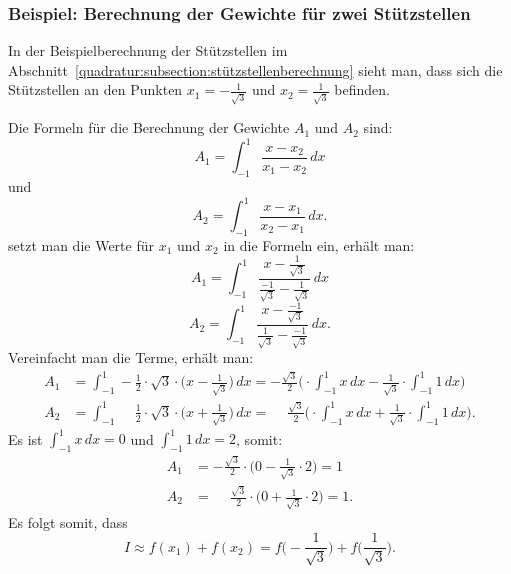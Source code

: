 \subsubsection{Beispiel: Berechnung der Gewichte für zwei Stützstellen}
In der Beispielberechnung der Stützstellen im
Abschnitt~\ref{quadratur:subsection:stützstellenberechnung} sieht man, dass sich die 
Stützstellen an den Punkten $x_{1} = -\frac{1}{\sqrt{3}} $ und $x_{2} = \frac{1}{\sqrt{3}} $ befinden.

Die Formeln für die Berechnung der Gewichte $A_{1}$ und $A_{2}$ sind:
\begin{equation*}
    A_{1} = \int_{-1}^{1} \frac{x - x_{2}}{x_{1} - x_{2}} \, dx
\end{equation*}
und
\begin{equation}
    A_{2} = \int_{-1}^{1} \frac{x - x_{1}}{x_{2} - x_{1}} \, dx.
\end{equation}
setzt man die Werte für $x_{1}$ und $x_{2}$ in die Formeln ein, erhält man:
\begin{equation*}
    A_{1} = \int_{-1}^{1} \frac{x - \frac{1}{\sqrt{3}}}{\frac{-1}{\sqrt{3}} - \frac{1}{\sqrt{3}}} \, dx
\end{equation*}
\begin{equation}
    A_{2} = \int_{-1}^{1} \frac{x - \frac{-1}{\sqrt{3}}}{\frac{1}{\sqrt{3}} - \frac{-1}{\sqrt{3}}} \, dx.
\end{equation}
Vereinfacht man die Terme, erhält man:
\begin{align}
    A_{1} 
    &=
    \int_{-1}^{1} -\frac{1}{2} 
    \cdot \sqrt{3} 
    \cdot \bigg(x - \frac{1}{\sqrt{3}}\bigg)
    \, dx
    =
    -\frac{\sqrt{3}}{2} 
    \bigg(
    \cdot \int_{-1}^{1}x\,dx
    -
    \frac{1}{\sqrt{3}} 
    \cdot \int_{-1}^{1}1\,dx
    \bigg)
    \\
    A_{2} 
    &=
    \int_{-1}^{1} \phantom{-}\frac{1}{2} 
    \cdot \sqrt{3}  
    \cdot \bigg(x + \frac{1}{\sqrt{3}}\bigg)
    \, dx
    =
    \phantom{-}
    \frac{\sqrt{3}}{2} 
    \bigg(
    \cdot \int_{-1}^{1}x\,dx
    +
    \frac{1}{\sqrt{3}} 
    \cdot \int_{-1}^{1}1\,dx
    \bigg).
\end{align}
Es ist $\int_{-1}^{1}x\,dx = 0$ und $\int_{-1}^{1}1\,dx = 2$, somit:
\begin{align}
    A_{1} 
    &=
    -\frac{\sqrt{3}}{2} 
    \cdot 
    \bigg( 0
    -
    \frac{1}{\sqrt{3}} 
    \cdot 2
    \bigg)
    =
    1
    \\
    A_{2} 
    &=
    \phantom{-}
    \frac{\sqrt{3}}{2} 
    \cdot
    \bigg( 0
    +
    \frac{1}{\sqrt{3}} 
    \cdot 2
    \bigg)
    = 
    1.
\end{align}
Es folgt somit, dass
\begin{equation}
    I 
    \approx 
    f(x_{1})+f(x_{2}) 
    = 
    f\biggl(-\frac{1}{\sqrt{3}}\biggr)
    +
    f\biggl(\frac{1}{\sqrt{3}}\biggr).
\end{equation}


